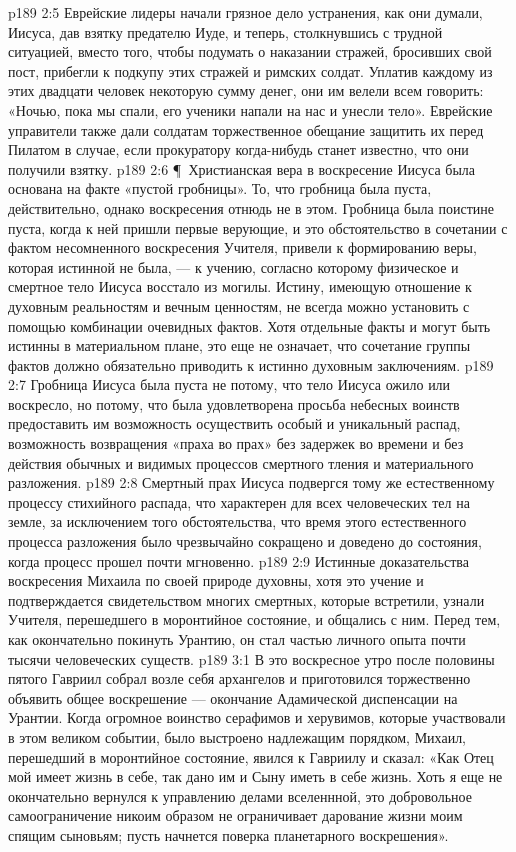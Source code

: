 \vs p189 2:5 Еврейские лидеры начали грязное дело устранения, как они думали, Иисуса, дав взятку предателю Иуде, и теперь, столкнувшись с трудной ситуацией, вместо того, чтобы подумать о наказании стражей, бросивших свой пост, прибегли к подкупу этих стражей и римских солдат. Уплатив каждому из этих двадцати человек некоторую сумму денег, они им велели всем говорить: «Ночью, пока мы спали, его ученики напали на нас и унесли тело». Еврейские управители также дали солдатам торжественное обещание защитить их перед Пилатом в случае, если прокуратору когда\hyp{}нибудь станет известно, что они получили взятку.
\vs p189 2:6 \P\ Христианская вера в воскресение Иисуса была основана на факте «пустой гробницы». То, что гробница была пуста, действительно,  однако  воскресения отнюдь не в этом. Гробница была поистине пуста, когда к ней пришли первые верующие, и это обстоятельство в сочетании с фактом несомненного воскресения Учителя, привели к формированию веры, которая истинной не была, --- к учению, согласно которому физическое и смертное тело Иисуса восстало из могилы. Истину, имеющую отношение к духовным реальностям и вечным ценностям, не всегда можно установить с помощью комбинации очевидных фактов. Хотя отдельные факты и могут быть истинны в материальном плане, это еще не означает, что сочетание группы фактов должно обязательно приводить к истинно духовным заключениям.
\vs p189 2:7 Гробница Иисуса была пуста не потому, что тело Иисуса ожило или воскресло, но потому, что была удовлетворена просьба небесных воинств предоставить им возможность осуществить особый и уникальный распад, возможность возвращения «праха во прах» без задержек во времени и без действия обычных и видимых процессов смертного тления и материального разложения.
\vs p189 2:8 Смертный прах Иисуса подвергся тому же естественному процессу стихийного распада, что характерен для всех человеческих тел на земле, за исключением того обстоятельства, что время этого естественного процесса разложения было чрезвычайно сокращено и доведено до состояния, когда процесс прошел почти мгновенно.
\vs p189 2:9 Истинные доказательства воскресения Михаила по своей природе духовны, хотя это учение и подтверждается свидетельством многих смертных, которые встретили, узнали Учителя, перешедшего в моронтийное состояние, и общались с ним. Перед тем, как окончательно покинуть Урантию, он стал частью личного опыта почти тысячи человеческих существ.
\vs p189 3:1 В это воскресное утро после половины пятого Гавриил собрал возле себя архангелов и приготовился торжественно объявить общее воскрешение --- окончание Адамической диспенсации на Урантии. Когда огромное воинство серафимов и херувимов, которые участвовали в этом великом событии, было выстроено надлежащим порядком, Михаил, перешедший в моронтийное состояние, явился к Гавриилу и сказал: «Как Отец мой имеет жизнь в себе, так дано им и Сыну иметь в себе жизнь. Хоть я еще не окончательно вернулся к управлению делами вселеннной, это добровольное самоограничение никоим образом не ограничивает дарование жизни моим спящим сыновьям; пусть начнется поверка планетарного воскрешения».
